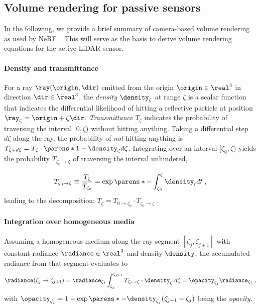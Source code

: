 \subsection{Volume rendering for passive sensors}
\label{sec:revisit_vr}
In the following, we provide a brief summary of camera-based volume rendering as used by NeRF~\cite{mildenhall2020nerf,tagliasacchi2022volume}. This will serve as the basis to derive volume rendering equations for the active LiDAR sensor.

\paragraph{Density and transmittance}
For a ray $\ray(\origin, \dir)$ emitted from the origin $\origin \in \real^3$ in direction $\dir \in \real^3$, the \textit{density} $\density_\zeta$ at range $\zeta$ is a scalar function that indicates the differential likelihood of hitting a reflective particle at position $\ray_\zeta = \origin + \zeta \dir$. \textit{Transmittance} $T_{\zeta}$ indicates the probability of traversing the interval $[0, \zeta)$ without hitting anything. Taking a differential step $d\zeta$ along the ray,  the probability of \emph{not} hitting anything is $T_{\zeta+d\zeta} = T_{\zeta} \cdot \parens*{1 -\density_\zeta d\zeta}$.
Integrating over an interval $[\zeta_0, \zeta)$ yields the probability $T_{\zeta_0 \rightarrow \zeta}$ of traversing the interval unhindered,

\begin{equation}
T_{\zeta_0 \rightarrow \zeta} \equiv \frac{T_{\zeta}}{T_{\zeta_0}} = \exp\parens*{-\int_{\zeta_0}^\zeta \density_t dt}\;,
\label{eq:iccv_trans_ab}
\end{equation}
leading to the decomposition: $T_{\zeta} = T_{0 \rightarrow \zeta_0} \cdot T_{\zeta_0 \rightarrow \zeta}\;.$
    


\paragraph{Integration over homogeneous media}
Assuming a homogeneous medium along the ray segment $[\zeta_j, \zeta_{j+1}]$ with constant radiance $\radiance \in \real^3$ and density $\density$, the accumulated radiance from that segment evaluates to 
\begin{equation}
    \radiance(\zeta_j \rightarrow \zeta_{j+1}) 
    = \radiance_{\zeta_j}\int_{\zeta_j}^{\zeta_{j+1}} T_{\zeta_j \rightarrow \zeta} \cdot \density_\zeta \; d\zeta
    = \opacity_{\zeta_j} \radiance_{\zeta_j}\;,
\end{equation}
with $\opacity_{\zeta_j}=1-\exp\parens*{{-\density_{\zeta_j}(\zeta_{j+1} - \zeta_j)}}$ being the \textit{opacity}. 

